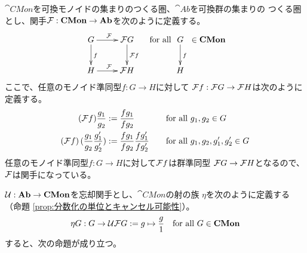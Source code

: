 {	$\cat{CMon}$を可換モノイドの集まりのつくる圏、$\cat{Ab}$を可換群の集まりの
	つくる圏とし、関手$\mathcal{F}:{\mathbf{CMon}}\to{\mathbf{Ab}}$を次のように定義する。
	\begin{equation*}\begin{split}
		\xymatrix{
			G \ar[r]^\calF \ar[d]^f & \calF G \ar[d]^{\calF f} \\
			H \ar[r]^\calF & \calF H \\
		} \quad\text{for all } \xymatrix{
			G \ar[d]^f \\ H
		}\in \cat{CMon}
	\end{split}\end{equation*}
	ここで、任意のモノイド準同型$f:G\to H$に対して
	$\mathcal{F} f:\mathcal{F} G\to\mathcal{F} H$は次のように定義する。
	\begin{alignat*}{2}
		(\mathcal{F} f)\frac{g_1}{g_2} &:= \frac{fg_1}{fg_2}
		&\quad&\text{for all } g_1,g_2\in G \\
		(\mathcal{F} f)\mathinner{({\frac{g_1}{g_2}\frac{g_1'}{g_2'}})} 
		&:= \frac{fg_1}{fg_2}\frac{fg_1'}{fg_2'}
		&\quad&\text{for all } g_1,g_2,g_1',g_2'\in G
	\end{alignat*}
	任意のモノイド準同型$f:G\to H$に対して$\mathcal{F} f$は群準同型
	$\mathcal{F} G\to\mathcal{F} H$となるので、$\mathcal{F}$は関手になっている。

	$\mathcal{U}:{\mathbf{Ab}}\to{\mathbf{CMon}}$を忘却関手とし、$\cat{CMon}$の射の族
	$\eta$を次のように定義する（命題
	\ref{prop:分数化の単位とキャンセル可能性}）。
	\begin{equation*}\begin{split}
		\eta G: G \to \mathcal{U}\mathcal{F} G := g \mapsto \frac{g}{1}
		\quad\text{for all } G\in{\mathbf{CMon}}
	\end{split}\end{equation*}
	すると、次の命題が成り立つ。
	
}
